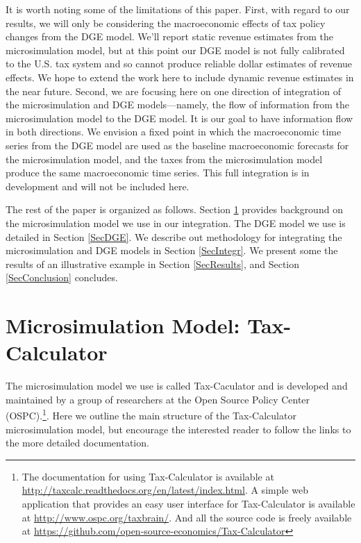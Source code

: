 \documentclass[letterpaper,12pt]{article}
\theoremstyle{definition}
\begin{document}
\begin{spacing}{1.5}
  It is worth noting some of the limitations of this paper. First, with regard to our results, we will only be considering the macroeconomic effects of tax policy changes from the DGE model.  We'll report static revenue estimates from the microsimulation model, but at this point our DGE model is not fully calibrated to the U.S. tax system and so cannot produce reliable dollar estimates of revenue effects. We hope to extend the work here to include dynamic revenue estimates in the near future. Second, we are focusing here on one direction of integration of the microsimulation and DGE models---namely, the flow of information from the microsimulation model to the DGE model. It is our goal to have information flow in both directions. We envision a fixed point in which the macroeconomic time series from the DGE model are used as the baseline macroeconomic forecasts for the microsimulation model, and the taxes from the microsimulation model produce the same macroeconomic time series. This full integration is in development and will not be included here.

  The rest of the paper is organized as follows. Section \ref{SecMicrosim} provides background on the microsimulation model we use in our integration. The DGE model we use is detailed in Section \ref{SecDGE}.  We describe out methodology for integrating the microsimulation and DGE models in Section \ref{SecIntegr}. We present some the results of an illustrative example in Section \ref{SecResults}, and Section \ref{SecConclusion} concludes.


\section{Microsimulation Model: Tax-Calculator}\label{SecMicrosim}

  The microsimulation model we use is called Tax-Caculator and is developed and maintained by a group of researchers at the Open Source Policy Center (OSPC).\footnote{The documentation for using Tax-Calculator is available at \href{http://taxcalc.readthedocs.org/en/latest/index.html}{http://taxcalc.readthedocs.org/en/latest/index.html}. A simple web application that provides an easy user interface for Tax-Calculator is available at \href{http://www.ospc.org/taxbrain/}{http://www.ospc.org/taxbrain/}. And all the source code is freely available at \href{https://github.com/open-source-economics/Tax-Calculator}{https://github.com/open-source-economics/Tax-Calculator}}. Here we outline the main structure of the Tax-Calculator microsimulation model, but encourage the interested reader to follow the links to the more detailed documentation.


\end{spacing}
\end{document}

